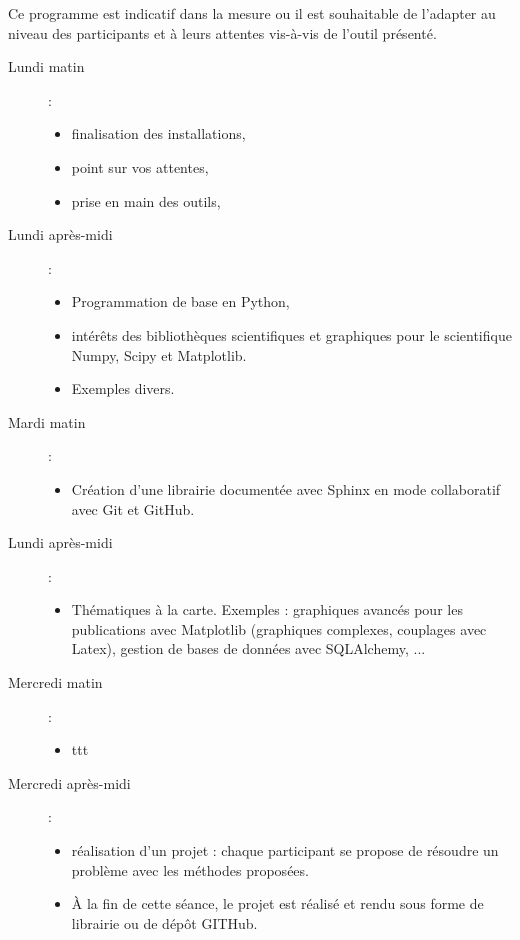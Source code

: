 \documentclass[a4paper,10pt,twoside]{article}
\begin{document}
Ce programme est indicatif dans la mesure ou il est souhaitable de l'adapter au niveau des participants et à leurs attentes vis-à-vis de l'outil présenté.
\begin{description}
\item[Lundi matin]: 
\begin{itemize}
\item finalisation des installations, 
\item point sur vos attentes,
\item prise en main des outils,
\end{itemize}

\item[Lundi après-midi]: 
\begin{itemize}
\item Programmation de base en Python, 
\item intérêts des bibliothèques scientifiques et graphiques pour le scientifique Numpy, Scipy et Matplotlib. 
\item Exemples divers.
\end{itemize}

\item[Mardi matin]: 
\begin{itemize}
\item Création d'une librairie documentée avec Sphinx en mode collaboratif avec Git et GitHub.
\end{itemize}

\item[Lundi après-midi]: 
\begin{itemize}
\item Thématiques à la carte. Exemples : graphiques avancés pour les publications avec Matplotlib (graphiques complexes, couplages avec Latex), gestion de bases de données avec SQLAlchemy, ... 
\end{itemize}
\item[Mercredi matin]:
\begin{itemize}
\item ttt
\end{itemize}
\item[Mercredi après-midi]: 
\begin{itemize}
\item réalisation d'un projet : chaque participant se propose de résoudre un problème avec les méthodes proposées. 
\item À la fin de cette séance, le projet est réalisé et rendu sous forme de librairie ou de dépôt GITHub.
\end{itemize}
\end{description}
\end{document}
